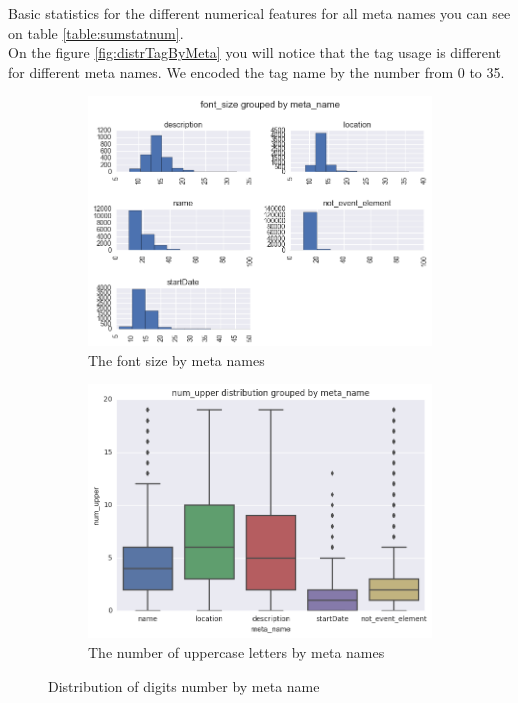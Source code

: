Basic statistics for the different numerical features for all meta names you can see on table \ref{table:sumstatnum}.\\

On the figure \ref{fig:distrTagByMeta} you will notice that the tag usage is different for different meta names. We encoded the tag name by the number from 0 to 35.  \\

\begin{figure}[h]
\begin{subfigure}{.5\textwidth}
  \centering
  \includegraphics[width=1\textwidth]{figures07/distrFontSizeByMeta}
  \caption{The font size by meta names}
  \label{fig:distrFontSizeByMeta}
\end{subfigure}
\begin{subfigure}{.5\textwidth}
  \centering
    \includegraphics[width=1\textwidth]{figures07/boxUpperByMeta}
    \caption{The number of uppercase letters by meta names}
    \label{fig:boxUpperByMeta}
\end{subfigure}
\caption{Distribution of digits number by meta name}
\end{figure}

